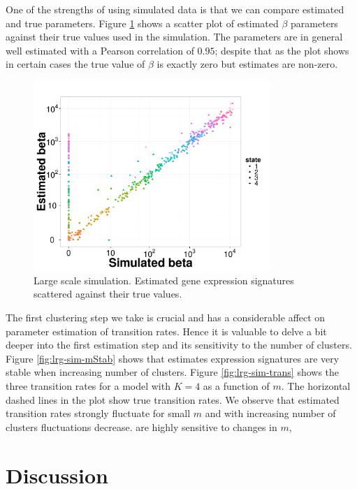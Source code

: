 One of the strengths of using simulated data is that we can compare estimated and true parameters. Figure \ref{fig:lrg-sim-scatter-b} shows a scatter plot of estimated $\beta$ parameters against their true values used in the simulation. The parameters are in general well estimated with a Pearson correlation of $0.95$; despite that as the plot shows in certain cases the true value of $\beta$ is exactly zero but estimates are non-zero. 

\begin{figure}[!h]
  \centering
  \includegraphics[width=0.8\textwidth]{pics/beta-sim.pdf}
  \caption{Large scale simulation. Estimated gene expression signatures scattered against their true values. }
  \label{fig:lrg-sim-scatter-b}
\end{figure}

The first clustering step we take is crucial and has a considerable affect on parameter estimation of transition rates. Hence it is valuable to delve a bit deeper into the first estimation step and its sensitivity to the number of clusters. Figure \ref{fig:lrg-sim-mStab} shows that estimates expression signatures are very stable when increasing number of clusters. Figure \ref{fig:lrg-sim-trans} shows the three transition rates for a model with $K=4$ as a function of $m$. The horizontal dashed lines in the plot show true transition rates. We observe that estimated transition rates strongly fluctuate for small $m$ and with increasing number of clusters fluctuations decrease. are highly sensitive to changes in $m$,

\section{Discussion}
\label{sec:discussion}

